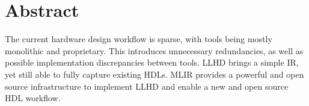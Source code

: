 


\begingroup
\let\clearpage\relax
\let\cleardoublepage\relax
\let\cleardoublepage\relax

\chapter*{Abstract}
The current hardware design workflow is sparse,  with tools being mostly monolithic and proprietary. This introduces unnecessary redundancies, as well as possible implementation discrepancies between tools. LLHD brings a simple IR, yet still able to fully capture existing HDLs. MLIR provides a powerful and open source infrastructure to implement LLHD and enable a new and open source HDL workflow.
\endgroup

\vfill